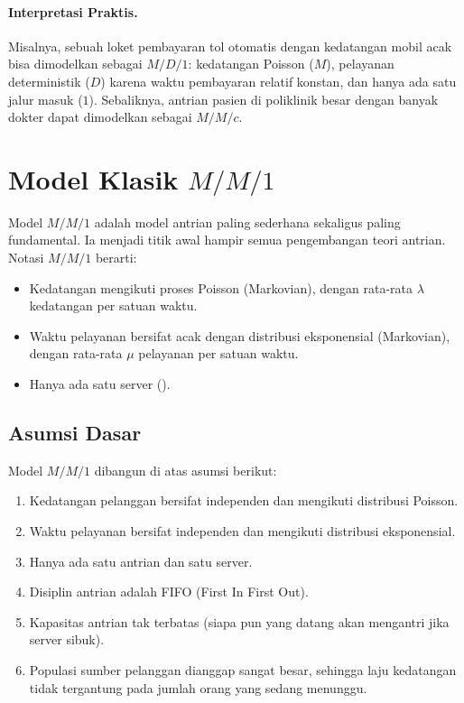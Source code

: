 \documentclass{bukumjh}
\begin{document}
\paragraph{Interpretasi Praktis.}  
Misalnya, sebuah loket pembayaran tol otomatis dengan kedatangan mobil acak bisa dimodelkan sebagai $M/D/1$: kedatangan Poisson ($M$), pelayanan deterministik ($D$) karena waktu pembayaran relatif konstan, dan hanya ada satu jalur masuk ($1$). Sebaliknya, antrian pasien di poliklinik besar dengan banyak dokter dapat dimodelkan sebagai $M/M/c$.

\section{Model Klasik $M/M/1$}

Model $M/M/1$ adalah model antrian paling sederhana sekaligus paling fundamental. Ia menjadi titik awal hampir semua pengembangan teori antrian. Notasi $M/M/1$ berarti:
\begin{itemize}
    \item Kedatangan mengikuti proses Poisson ({\jsg Markovian}), dengan rata-rata $\lambda$ kedatangan per satuan waktu.
    \item Waktu pelayanan bersifat acak dengan distribusi eksponensial ({\jsg Markovian}), dengan rata-rata $\mu$ pelayanan per satuan waktu.
    \item Hanya ada satu server ({}).
\end{itemize}

\subsection{Asumsi Dasar}
Model $M/M/1$ dibangun di atas asumsi berikut:
\begin{enumerate}
    \item Kedatangan pelanggan bersifat independen dan mengikuti distribusi Poisson.
    \item Waktu pelayanan bersifat independen dan mengikuti distribusi eksponensial.
    \item Hanya ada satu antrian dan satu server.
    \item Disiplin antrian adalah FIFO (First In First Out).
    \item Kapasitas antrian tak terbatas (siapa pun yang datang akan mengantri jika server sibuk).
    \item Populasi sumber pelanggan dianggap sangat besar, sehingga laju kedatangan tidak tergantung pada jumlah orang yang sedang menunggu.
\end{enumerate}
\end{document}
